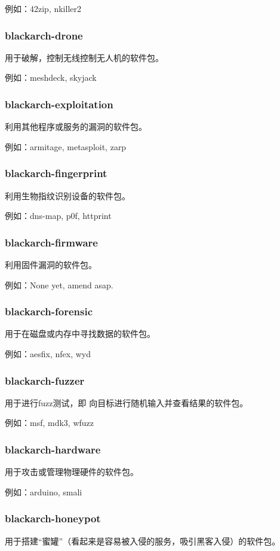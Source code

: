 \documentclass[a4paper, oneside, 11pt]{book}
\begin{document}
例如：42zip, nkiller2

\subsubsection{blackarch-drone}
用于破解，控制无线控制无人机的软件包。

例如：meshdeck, skyjack

\subsubsection{blackarch-exploitation}
利用其他程序或服务的漏洞的软件包。

例如：armitage, metasploit, zarp

\subsubsection{blackarch-fingerprint}
利用生物指纹识别设备的软件包。

例如：dns-map, p0f, httprint

\subsubsection{blackarch-firmware}
利用固件漏洞的软件包。

例如：None yet, amend asap.

\subsubsection{blackarch-forensic}
用于在磁盘或内存中寻找数据的软件包。

例如：aesfix, nfex, wyd

\subsubsection{blackarch-fuzzer}
用于进行fuzz测试，即 向目标进行随机输入并查看结果的软件包。

例如：msf, mdk3, wfuzz

\subsubsection{blackarch-hardware}
用于攻击或管理物理硬件的软件包。

例如：arduino, smali

\subsubsection{blackarch-honeypot}
用于搭建“蜜罐”（看起来是容易被入侵的服务，吸引黑客入侵）的软件包。
\end{document}
